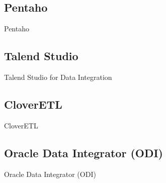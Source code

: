 \subsection{Pentaho}
Pentaho

\subsection{Talend Studio}
Talend Studio for Data Integration

\subsection{CloverETL}
CloverETL

\subsection{Oracle Data Integrator (ODI)}
Oracle Data Integrator (ODI)